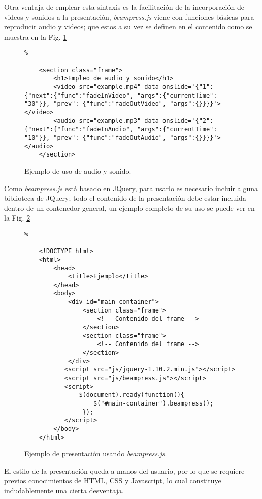 		Otra ventaja de emplear esta sintaxis es la facilitación de la incorporación de videos y sonidos a la presentación, \textit{beampress.js} viene con funciones básicas para reproducir audio y videos; que estos a su vez se definen en el contenido como se muestra en la Fig. \ref{fig:ex4}

			\begin{figure}[htb]%
				\begin{lstlisting}%

	<section class="frame">
		<h1>Empleo de audio y sonido</h1>
		<video src="example.mp4" data-onslide='{"1":{"next":{"func":"fadeInVideo", "args":{"currentTime": "30"}}, "prev": {"func":"fadeOutVideo", "args":{}}}}'></video>
		<audio src="example.mp3" data-onslide='{"2":{"next":{"func":"fadeInAudio", "args":{"currentTime": "10"}}, "prev": {"func":"fadeOutAudio", "args":{}}}}'></audio>    
	</section>				
				\end{lstlisting}
			\caption{
				Ejemplo de uso de audio y sonido. 
				\label{fig:ex4} }
			\end{figure}		

		Como \textit{beampress.js} está basado en JQuery, para usarlo es necesario incluir alguna biblioteca de JQuery; todo el contenido de la presentación debe estar incluida dentro de un contenedor general, un ejemplo completo de su uso se puede ver en la Fig. \ref{fig:ex5}

			\begin{figure}[htb]%
				\begin{lstlisting}%

	<!DOCTYPE html>
	<html>
		<head>
	    	<title>Ejemplo</title>
		</head>
		<body>
			<div id="main-container">
				<section class="frame">
					<!-- Contenido del frame -->
				</section>
				<section class="frame">
					<!-- Contenido del frame -->
				</section>						
			</div>
		   <script src="js/jquery-1.10.2.min.js"></script>
		   <script src="js/beampress.js"></script>
		   <script>
		       $(document).ready(function(){     
		           $("#main-container").beampress();
		        });
		   </script>		
		</body>
	</html>			
				\end{lstlisting}
			\caption{
				Ejemplo de presentación usando \textit{beampress.js}. 
				\label{fig:ex5} }
			\end{figure}	

		El estilo de la presentación queda a manos del usuario, por lo que se requiere previos conocimientos 
		de HTML, CSS y Javascript, lo cual constituye indudablemente una cierta desventaja. 

		
